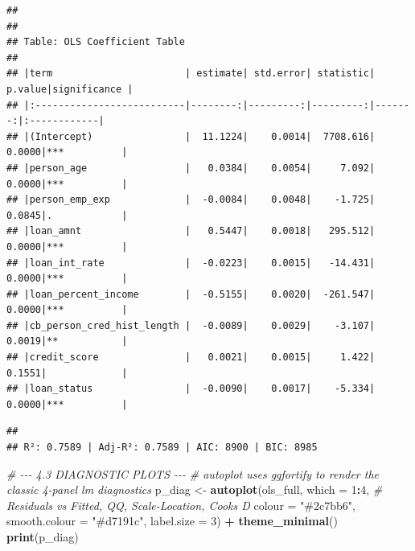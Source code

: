 \documentclass[
]{article}
\newenvironment{Shaded}{\begin{snugshade}}{\end{snugshade}}
\newcommand{\AttributeTok}[1]{\textcolor[rgb]{0.13,0.29,0.53}{#1}}
\newcommand{\CommentTok}[1]{\textcolor[rgb]{0.56,0.35,0.01}{\textit{#1}}}
\newcommand{\DecValTok}[1]{\textcolor[rgb]{0.00,0.00,0.81}{#1}}
\newcommand{\FunctionTok}[1]{\textcolor[rgb]{0.13,0.29,0.53}{\textbf{#1}}}
\newcommand{\NormalTok}[1]{#1}
\newcommand{\OtherTok}[1]{\textcolor[rgb]{0.56,0.35,0.01}{#1}}
\newcommand{\SpecialCharTok}[1]{\textcolor[rgb]{0.81,0.36,0.00}{\textbf{#1}}}
\newcommand{\StringTok}[1]{\textcolor[rgb]{0.31,0.60,0.02}{#1}}
\begin{document}
\begin{verbatim}
## 
## 
## Table: OLS Coefficient Table
## 
## |term                       | estimate| std.error| statistic| p.value|significance |
## |:--------------------------|--------:|---------:|---------:|-------:|:------------|
## |(Intercept)                |  11.1224|    0.0014|  7708.616|  0.0000|***          |
## |person_age                 |   0.0384|    0.0054|     7.092|  0.0000|***          |
## |person_emp_exp             |  -0.0084|    0.0048|    -1.725|  0.0845|.            |
## |loan_amnt                  |   0.5447|    0.0018|   295.512|  0.0000|***          |
## |loan_int_rate              |  -0.0223|    0.0015|   -14.431|  0.0000|***          |
## |loan_percent_income        |  -0.5155|    0.0020|  -261.547|  0.0000|***          |
## |cb_person_cred_hist_length |  -0.0089|    0.0029|    -3.107|  0.0019|**           |
## |credit_score               |   0.0021|    0.0015|     1.422|  0.1551|             |
## |loan_status                |  -0.0090|    0.0017|    -5.334|  0.0000|***          |
\end{verbatim}

\begin{Shaded}
\end{Shaded}

\begin{verbatim}
## 
## R²: 0.7589 | Adj-R²: 0.7589 | AIC: 8900 | BIC: 8985
\end{verbatim}

\begin{Shaded}
\begin{Highlighting}[]
\CommentTok{\# {-}{-}{-} 4.3  DIAGNOSTIC PLOTS {-}{-}{-}}
\CommentTok{\# autoplot uses ggfortify to render the classic 4{-}panel lm diagnostics}
\NormalTok{p\_diag }\OtherTok{\textless{}{-}} \FunctionTok{autoplot}\NormalTok{(ols\_full,}
                   \AttributeTok{which  =} \DecValTok{1}\SpecialCharTok{:}\DecValTok{4}\NormalTok{,      }\CommentTok{\# Residuals vs Fitted, QQ, Scale{-}Location, Cook\textquotesingle{}s D}
                   \AttributeTok{colour =} \StringTok{"\#2c7bb6"}\NormalTok{,}
                   \AttributeTok{smooth.colour =} \StringTok{"\#d7191c"}\NormalTok{,}
                   \AttributeTok{label.size =} \DecValTok{3}\NormalTok{) }\SpecialCharTok{+}
  \FunctionTok{theme\_minimal}\NormalTok{()}
\FunctionTok{print}\NormalTok{(p\_diag)}
\end{Highlighting}
\end{Shaded}
\end{document}

